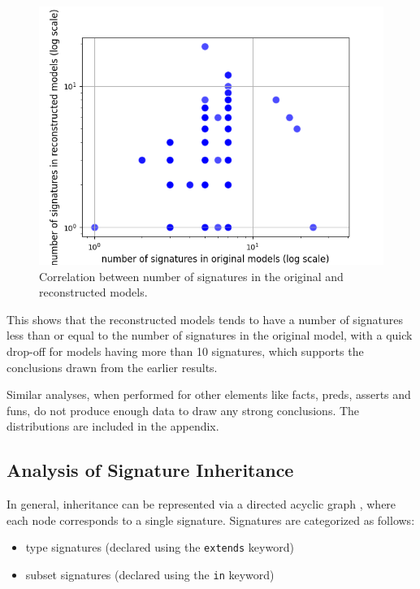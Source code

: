 \documentclass[conference]{IEEEtran}
\begin{document}
    \begin{figure}[htbp]
        \centerline{\includegraphics[width=\linewidth]{"./Correlation between number of signatures in the original and reconstructed models.png"}}
        \caption{Correlation between number of signatures in the original and reconstructed models.}
        \label{fig}
        \end{figure}

        This shows that the reconstructed models tends to have a number of signatures less than or equal to the number of signatures in the original model, with a quick drop-off for models having more than 10 signatures, which supports the conclusions drawn from the earlier results.

        Similar analyses, when performed for other elements like facts, preds, asserts and funs, do not produce enough data to draw any strong conclusions. The distributions are included in the appendix.

\subsection{Analysis of Signature Inheritance}

In general, inheritance can be represented via a directed acyclic graph \cite{jackson-reference}, where each node corresponds to a single signature. Signatures are categorized as follows:

\begin{itemize}
    \item type signatures (declared using the \verb|extends| keyword)
    \item subset signatures (declared using the \verb|in| keyword)
\end{itemize}
\end{document}
